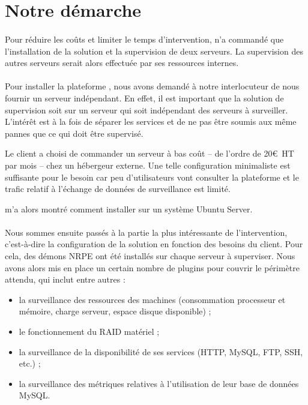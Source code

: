 \section{Notre démarche}

\paragraph{}
Pour réduire les coûts et limiter le temps d'intervention, \adacast{} n'a commandé que l'installation de la solution \acentreon{} et la supervision de deux serveurs.
La supervision des autres serveurs serait alors effectuée par ses ressources internes.

\paragraph{}
Pour installer la plateforme \acentreon{}, nous avons demandé à notre interlocuteur de nous fournir un serveur indépendant.
En effet, il est important que la solution de supervision soit sur un serveur qui soit indépendant des serveurs à surveiller.
L'intérêt est à la fois de séparer les services et de ne pas être soumis aux même pannes que ce qui doit être supervisé.

Le client a choisi de commander un serveur à bas coût -- de l'ordre de 20\euro~HT par mois -- chez un hébergeur externe.
Une telle configuration minimaliste est suffisante pour le besoin car peu d'utilisateurs vont consulter la plateforme \acentreon{} et le trafic relatif à l'échange de données de surveillance est limité.

\asegir{} m'a alors montré comment installer \acentreon{} sur un système \alinux{} Ubuntu Server.

\paragraph{}
Nous sommes ensuite passés à la partie la plus intéressante de l'intervention, c'est-à-dire la configuration de la solution en fonction des besoins du client.
Pour cela, des démons NRPE ont été installés sur chaque serveur à superviser.
Nous avons alors mis en place un certain nombre de plugins pour couvrir le périmètre attendu, qui inclut entre autres :

\begin{itemize}
	\item la surveillance des ressources des machines (consommation processeur et mémoire, charge serveur, espace disque disponible) ;
	\item le fonctionnement du RAID matériel ;
	\item la surveillance de la disponibilité de ses services (HTTP, MySQL, FTP, SSH, etc.) ;
	\item la surveillance des métriques relatives à l'utilisation de leur base de données MySQL.
\end{itemize}

